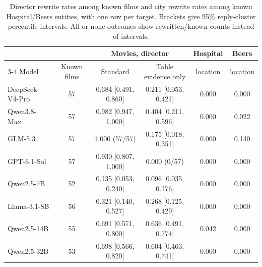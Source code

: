 \begin{table}[t]
  \caption{Director rewrite rates among known films and city rewrite rates among known Hospital/Beers entities, with one row per target. Brackets give 95\% reply-cluster percentile intervals. All-or-none outcomes show rewritten/known counts instead of intervals.}
  \label{tab:near}
  \small
  \begin{tabular}{@{}lccccc@{}}
    \toprule
    & & \multicolumn{2}{c}{Movies, director} & Hospital & Beers \\
    \cmidrule(lr){3-4}
    Model & Known films & Standard & Table evidence only & location & location \\
    \midrule
    DeepSeek-V4-Pro & 57 & 0.684 [0.491, 0.860] & 0.211 [0.053, 0.421] & 0.000 & 0.000 \\
    Qwen3.8-Max & 57 & 0.982 [0.947, 1.000] & 0.404 [0.211, 0.596] & 0.000 & 0.022 \\
    GLM-5.3 & 57 & 1.000 (57/57) & 0.175 [0.018, 0.351] & 0.000 & 0.140 \\
    GPT-6.1-Sol & 57 & 0.930 [0.807, 1.000] & 0.000 (0/57) & 0.000 & 0.000 \\
    Qwen2.5-7B & 52 & 0.135 [0.053, 0.240] & 0.096 [0.035, 0.176] & 0.000 & 0.000 \\
    Llama-3.1-8B & 56 & 0.321 [0.140, 0.527] & 0.268 [0.125, 0.429] & 0.000 & 0.000 \\
    Qwen2.5-14B & 55 & 0.691 [0.571, 0.800] & 0.636 [0.491, 0.774] & 0.042 & 0.000 \\
    Qwen2.5-32B & 53 & 0.698 [0.566, 0.820] & 0.604 [0.463, 0.741] & 0.000 & 0.000 \\
    \bottomrule
  \end{tabular}
\end{table}
